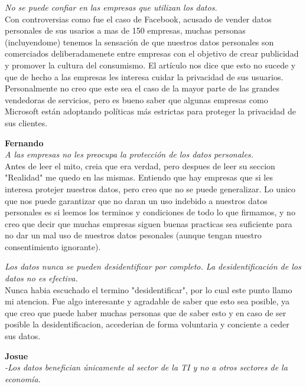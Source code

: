 \documentclass[12pt,a4paper]{article}
\begin{document}
\begin{enumerate}
\begin{enumerate}
				\textit {No se puede confiar en las empresas que utilizan los datos.}\\
				
        			Con controversias como fue el caso de Facebook, acusado de vender 
				datos personales de sus usarios a mas de 150 empresas, muchas personas (incluyendome) 
				tenemos la sensación de que nuestros datos personales son comerciados deliberadamenete 
				entre empresas con el objetivo de crear publicidad y promover la cultura del consumismo. 
				El artículo nos dice que esto no sucede y que de hecho a las empresas les interesa cuidar 
				la privacidad de sus usuarios. Personalmente no creo que este sea el caso de la mayor 
				parte de las grandes vendedoras de servicios, pero es bueno saber que algunas empresas 
				como Microsoft están adoptando políticas más estrictas para proteger la privacidad de 
				sus clientes.
				
				\textbf{Fernando}\\
				\textit {A las empresas no les preocupa la protección de los datos personales.} \\

				Antes de leer el mito, creia que era verdad, pero despues de leer su seccion "Realidad" me quedo en las mismas.
				Entiendo que hay empresas que si les interesa protejer nuestros datos, pero creo que no se puede generalizar. Lo unico que
				nos puede garantizar que no daran un uso indebido a nuestros datos personales es si leemos los terminos y condiciones de
				todo lo que firmamos, y no creo que decir que muchas empresas siguen buenas practicas sea suficiente para no dar un mal 
				uso de nuestros datos pesonales (aunque tengan nuestro consentimiento ignorante).


				\textit {Los datos nunca se pueden desidentificar por completo. La desidentificación de los datos no es efectiva.} \\

				Nunca habia escuchado el termino "desidentificar", por lo cual este punto llamo mi atencion.
				Fue algo interesante y agradable de saber que esto sea posible, ya que creo que puede haber muchas personas que de saber 
				esto y en caso de ser posible la desidentificacion, accederian de forma voluntaria y conciente a ceder sus datos.
				
				
				\textbf{Josue}\\
				\textit {-Los datos benefician únicamente al sector de
la TI y no a otros sectores de la economía.
} \\


\end{enumerate}
\end{enumerate}
\end{document}
